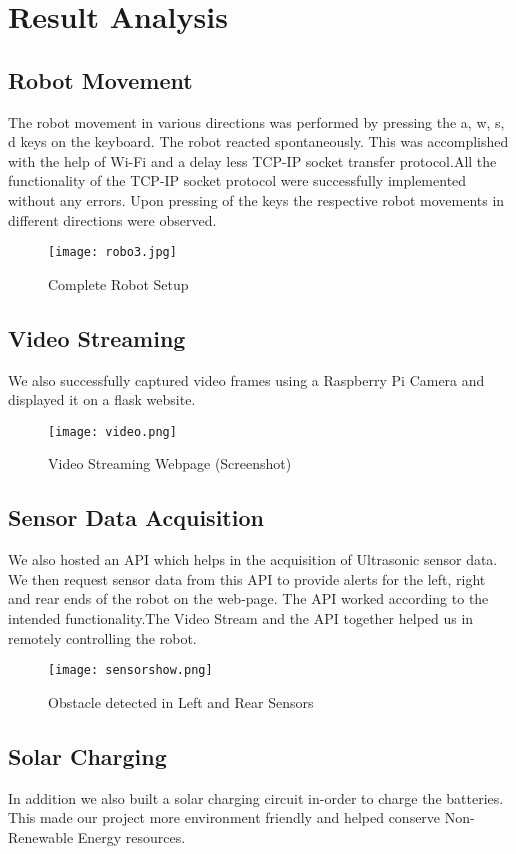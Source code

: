 \chapter{Result Analysis}
\section{Robot Movement}
The robot movement in various directions was performed by pressing the a, w, s,
d keys on the keyboard. The robot reacted spontaneously. This was accomplished
with the help of Wi-Fi and a delay less TCP-IP socket transfer protocol.All the functionality of 
the TCP-IP socket protocol were successfully implemented without any errors. Upon pressing of the keys the
respective robot movements in different directions were observed.
\begin{figure}[h]
\centering
\texttt{[image: robo3.jpg]}
\caption{Complete Robot Setup}
\end{figure}
\section{Video Streaming}
We also successfully captured video frames using a Raspberry Pi Camera and displayed it on a flask website.
\begin{figure}[h]
\centering
\texttt{[image: video.png]}
\caption{Video Streaming Webpage (Screenshot)}
\end{figure}
\section{Sensor Data Acquisition}
We also hosted an API which helps in the acquisition of Ultrasonic sensor data. We then 
request sensor data from this API to provide alerts for the left, right and rear ends 
of the robot on the web-page. The API worked according to the intended functionality.The Video Stream and the API together helped us in remotely controlling the robot.
\begin{figure}[h]
\centering
\texttt{[image: sensorshow.png]}
\caption{Obstacle detected in Left and Rear Sensors}
\end{figure}
\section{Solar Charging}
In addition we also built a solar charging circuit in-order to charge the batteries. This made our project more environment friendly and helped conserve Non-Renewable Energy resources.